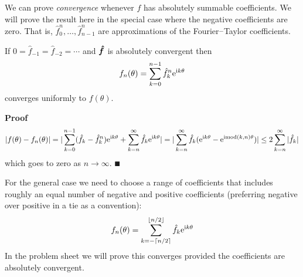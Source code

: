 We can  prove \emph{convergence} whenever $f$ has absolutely summable coefficients. We will prove the result here in the special case where the negative coefficients are zero. That is, $\hat f_0^n, \ensuremath{\ldots}, \hat f_{n-1}^n$ are approximations of the Fourier\ensuremath{\endash}Taylor coefficients.

\begin{theorem} If $0 = \hat f_{-1} = \hat f_{-2} = \ensuremath{\cdots}$ and ${\mbox{\boldmath$\hat f$\unboldmath}}$ is absolutely convergent then
\[
f_n(\ensuremath{\theta}) = \ensuremath{\sum}_{k=0}^{n-1} \hat f_k^n {\rm e}^{{\rm i} k \ensuremath{\theta}}
\]
converges uniformly to $f(\ensuremath{\theta})$.

\end{theorem}
\textbf{Proof}
\begin{align*}
|f(\ensuremath{\theta}) - f_n(\ensuremath{\theta})| = |\ensuremath{\sum}_{k=0}^{n-1} (\hat f_k - \hat f_k^n) {\rm e}^{{\rm i} k \ensuremath{\theta}} + \ensuremath{\sum}_{k=n}^\ensuremath{\infty} \hat f_k {\rm e}^{{\rm i} k \ensuremath{\theta}}|
= |\ensuremath{\sum}_{k=n}^\ensuremath{\infty} \hat f_k ({\rm e}^{{\rm i} k \ensuremath{\theta}} - {\rm e}^{{\rm i} {\rm mod}(k,n) \ensuremath{\theta}})|
\ensuremath{\leq} 2 \ensuremath{\sum}_{k=n}^\ensuremath{\infty} |\hat f_k|
\end{align*}
which goes to zero as $n \ensuremath{\rightarrow} \ensuremath{\infty}$. \ensuremath{\QED}

For the general case we need to choose a range of coefficients that includes roughly an equal number of negative and positive coefficients (preferring negative over positive in a tie as a convention):
\[
f_n(\ensuremath{\theta}) = \ensuremath{\sum}_{k=-\ensuremath{\lceil}n/2\ensuremath{\rceil}}^{\ensuremath{\lfloor}n/2\ensuremath{\rfloor}} \hat f_k {\rm e}^{{\rm i} k \ensuremath{\theta}}
\]
In the problem sheet we will prove this converges provided the coefficients are absolutely convergent.



